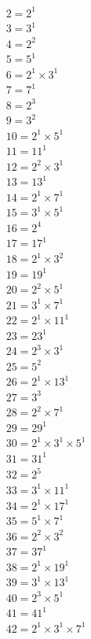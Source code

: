 \begin{equation*}
\begin{aligned}
& 2 = 2^{1} \\
& 3 = 3^{1} \\
& 4 = 2^{2} \\
& 5 = 5^{1} \\
& 6 = 2^{1} × 3^{1} \\
& 7 = 7^{1} \\
& 8 = 2^{3} \\
& 9 = 3^{2} \\
& 10 = 2^{1} × 5^{1} \\
& 11 = 11^{1} \\
& 12 = 2^{2} × 3^{1} \\
& 13 = 13^{1} \\
& 14 = 2^{1} × 7^{1} \\
& 15 = 3^{1} × 5^{1} \\
& 16 = 2^{4} \\
& 17 = 17^{1} \\
& 18 = 2^{1} × 3^{2} \\
& 19 = 19^{1} \\
& 20 = 2^{2} × 5^{1} \\
& 21 = 3^{1} × 7^{1} \\
& 22 = 2^{1} × 11^{1} \\
& 23 = 23^{1} \\
& 24 = 2^{3} × 3^{1} \\
& 25 = 5^{2} \\
& 26 = 2^{1} × 13^{1} \\
& 27 = 3^{3} \\
& 28 = 2^{2} × 7^{1} \\
& 29 = 29^{1} \\
& 30 = 2^{1} × 3^{1} × 5^{1} \\
& 31 = 31^{1} \\
& 32 = 2^{5} \\
& 33 = 3^{1} × 11^{1} \\
& 34 = 2^{1} × 17^{1} \\
& 35 = 5^{1} × 7^{1} \\
& 36 = 2^{2} × 3^{2} \\
& 37 = 37^{1} \\
& 38 = 2^{1} × 19^{1} \\
& 39 = 3^{1} × 13^{1} \\
& 40 = 2^{3} × 5^{1} \\
& 41 = 41^{1} \\
& 42 = 2^{1} × 3^{1} × 7^{1} \\

\end{aligned}
\end{equation*}
